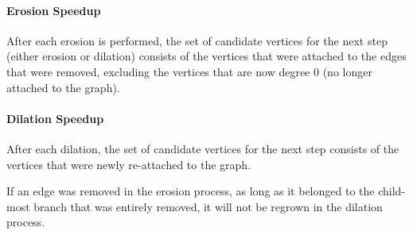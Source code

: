 \documentclass{InsightArticle}
\begin{document}
\paragraph{Erosion Speedup}
After each erosion is performed, the set of candidate vertices for the next step (either erosion or dilation) consists of the vertices that were attached to the edges that were removed, excluding the vertices that are now degree 0 (no longer attached to the graph).
\paragraph{Dilation Speedup}
After each dilation, the set of candidate vertices for the next step consists of the vertices that were newly re-attached to the graph.

If an edge was removed in the erosion process, as long as it belonged to the child-most branch that was entirely removed, it will not be regrown in the dilation process.




\end{document}
